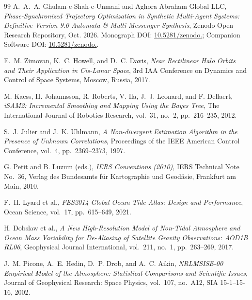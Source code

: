 \documentclass[11pt,a4paper,reqno]{article}
\def\texttt#1{#1}%
\newcommand{\zenodo}[1]{\href{https://doi.org/10.5281/zenodo.#1}{\texttt{10.5281/\allowbreak zenodo.\allowbreak #1}}}
\theoremstyle{plain}
\theoremstyle{definition}
\theoremstyle{remark}
\numberwithin{equation}{section}
\begin{document}
\begin{thebibliography}{99}
A.~A.~A. Ghulam-e-Shah-e-Unmani and {Aghora Abraham Global LLC},
\emph{Phase-Synchronized Trajectory Optimization in Synthetic Multi-Agent Systems: Definitive Version 9.0 Automata \& Multi-Messenger Synthesis},
Zenodo Open Research Repository, Oct. 2026.
Monograph DOI: \zenodo{23210362}; Companion Software DOI: \zenodo{23210644}.

E.~M. Zimovan, K.~C. Howell, and D.~C. Davis,
\emph{Near Rectilinear Halo Orbits and Their Application in Cis-Lunar Space},
3rd IAA Conference on Dynamics and Control of Space Systems, Moscow, Russia, 2017.

M. Kaess, H. Johannsson, R. Roberts, V. Ila, J.~J. Leonard, and F. Dellaert,
\emph{iSAM2: Incremental Smoothing and Mapping Using the Bayes Tree},
The International Journal of Robotics Research, vol.~31, no.~2, pp.~216--235, 2012.

S.~J. Julier and J.~K. Uhlmann,
\emph{A Non-divergent Estimation Algorithm in the Presence of Unknown Correlations},
Proceedings of the IEEE American Control Conference, vol.~4, pp.~2369--2373, 1997.

G. Petit and B. Luzum (eds.),
\emph{IERS Conventions (2010)},
IERS Technical Note No.~36, Verlag des Bundesamts f\"{u}r Kartographie und Geod\"{a}sie, Frankfurt am Main, 2010.

F.~H. Lyard et al.,
\emph{FES2014 Global Ocean Tide Atlas: Design and Performance},
Ocean Science, vol.~17, pp.~615--649, 2021.

H. Dobslaw et al.,
\emph{A New High-Resolution Model of Non-Tidal Atmosphere and Ocean Mass Variability for De-Aliasing of Satellite Gravity Observations: AOD1B RL06},
Geophysical Journal International, vol.~211, no.~1, pp.~263--269, 2017.

J.~M. Picone, A.~E. Hedin, D.~P. Drob, and A.~C. Aikin,
\emph{NRLMSISE-00 Empirical Model of the Atmosphere: Statistical Comparisons and Scientific Issues},
Journal of Geophysical Research: Space Physics, vol.~107, no.~A12, SIA 15-1--15-16, 2002.

\end{thebibliography}
\end{document}

